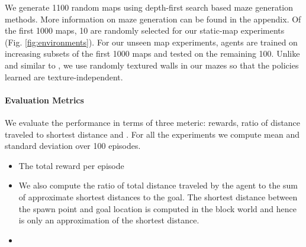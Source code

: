 We generate 1100 random maps using depth-first search based maze generation methods.
More information on maze generation can be found in the appendix. 
Of the first 1000 maps, 10 are randomly selected for our static-map experiments (Fig. \ref{fig:environments}). For our unseen map experiments, agents are trained on increasing subsets of the first 1000 maps and tested on the remaining 100.
Unlike \cite{MiPaViICLR2017} and similar to \cite{ChLaSaNIPS2016}, we use randomly textured walls in our mazes so that the policies learned are texture-independent.

\paragraph{Evaluation Metrics}
We evaluate the performance in terms of three meteric: rewards, ratio of distance traveled to shortest distance and \LatencyOneGtOne{}.
For all the experiments we compute mean and standard deviation over 100 episodes.
\begin{itemize}
\item The total reward per episode 
\item We also compute the ratio of total distance traveled by the agent to the sum of approximate shortest distances to the goal. The shortest distance between the spawn point and goal location is computed in the block world and hence is only an approximation of the shortest distance. 
\item 
\end{itemize}




